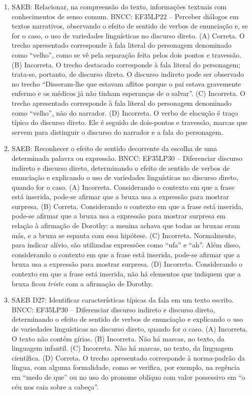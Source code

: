 \begin{enumerate}
\item
SAEB: Relacionar, na compreensão do texto, informações textuais com
conhecimentos de senso comum.
BNCC: EF35LP22 -- Perceber diálogos em textos narrativos, observando o
efeito de sentido de verbos de enunciação e, se for o caso, o uso de
variedades linguísticas no discurso direto.
(A) Correta. O trecho apresentado corresponde à fala literal do personagem
denominado como ``velho'', como se vê pela separação feita pelos dois
pontos e travessão.
(B) Incorreta. O trecho destacado corresponde à fala literal do personagem; 
trata-se, portanto, de discurso direto. O discurso indireto
pode ser observado no trecho ``Disseram-lhe que estavam aflitos
porque o pai estava gravemente enfermo e os médicos já não tinham
esperanças de o salvar''.
(C) Incorreta. O trecho apresentado corresponde à fala literal do personagem
denominado como ``velho'', não do narrador.  
(D) Incorreta. O verbo de elocução é traço típico do discurso direto. Ele é
seguido de dois-pontos e travessão, marcas que servem para distinguir o 
discurso do narrador e a fala do personagem.

\item
SAEB: Reconhecer o efeito
de sentido decorrente da escolha de uma determinada palavra ou
expressão.
BNCC: EF35LP30 -- Diferenciar discurso indireto e discurso direto,
determinando o efeito de sentido de verbos de enunciação e explicando o
uso de variedades linguísticas no discurso direto, quando for o caso.
(A) Incorreta. Considerando o contexto em que a frase está inserida, 
pode-se afirmar que a bruxa usa a expressão para mostrar surpresa.
(B) Correta. Considerando o contexto em que a frase está inserida, 
pode-se afirmar que a bruxa usa a expressão para mostrar surpresa em 
relação à afirmação de Dorothy: a menina achava que todas as bruxas eram
más, e a bruxa se espanta com essa hipótese.
(C)  Incorreta. Normalmente, para indicar alívio, são utilizadas
expressões como ``ufa'' e ``ah''. Além disso, considerando o contexto em
que a frase está inserida, pode-se afirmar que a bruxa usa a expressão 
para mostrar surpresa.
(D)  Incorreta. Considerando o contexto em que a frase está inserida, 
não há elementos que indiquem que a bruxa ficou \textit{triste} com a 
afirmação de Dorothy.

\item
SAEB D27: Identificar características típicas da fala em um texto
escrito.
BNCC: EF35LP30 -- Diferenciar discurso indireto e discurso direto,
determinando o efeito de sentido de verbos de enunciação e explicando o
uso de variedades linguísticas no discurso direto, quando for o caso.
(A)  Incorreta. O texto não contém gírias.
(B)  Incorreta. Não há marcas, no texto, da linguagem infantil.
(C)  Incorreta. Não há marcas, no texto, da linguagem científica.
(D)  Correta. O trecho apresentado corresponde à norma-padrão da língua, 
com alguma formalidade, como se verifica, por exemplo, na regência em
``medo de que'' ou no uso do pronome oblíquo com valor possessivo em 
``o céu nos caia sobre a cabeça''.
\end{enumerate}

